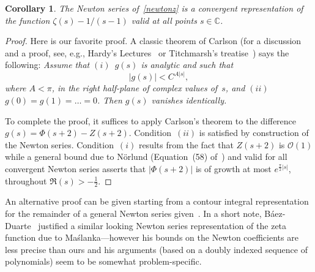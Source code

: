 \documentclass{amsart}
\def\C{\mathbb{C}}
\def\ds{\displaystyle}
\newtheorem{corollary}{Corollary}
\begin{document}
\begin{corollary}\label{newton-cor} The Newton series of~\eqref{newtonz} 
is a convergent representation of the function $\zeta(s)-1/(s-1)$
valid at all points $s\in\C$.
\end{corollary}
\begin{proof} 
Here  is our favorite  proof.  A   classic theorem  of Carlson  (for a
discussion        and      a     proof,     see,      e.g.,    Hardy's
Lectures~\cite[pp.~188-191]{Hardy78}          or          Titchmarsh's
treatise~\cite[\S5.81]{Titchmarsh39})  says the following:
\emph{Assume that $(i)$~$g(s)$ is
analytic and such that
\[
\left|g(s)\right|<C^{A|s|},
\]
where $A<\pi$, in the right half-plane of complex values of~$s$,
and $(ii)$~$g(0)=g(1)=\ldots=0$. Then $g(s)$ vanishes identically.}


To complete the proof, it  suffices to apply  Carlson's theorem to the
difference    $g(s)=\Phi(s+2)-Z(s+2)$.
Condition~$(ii)$ is    satisfied  by   construction  of    the  Newton
series. Condition~$(i)$ results from  the fact that $Z(s+2)$ is $\mathcal{O}(1)$
while  a general bound  due to N\"orlund 
(Equation~(58) of~\cite[p.~228]{Norlund54})
and valid for all convergent Newton series
asserts that $|\Phi(s+2)|$  is of 
growth at most $e^{\frac{\pi}{2}|s|}$, throughout $\Re(s)>-\frac12$.
% 
% 
% 
\end{proof}

An alternative proof can be given starting from a contour integral representation for the remainder of 
a general Newton series given~\cite[p.~223]{Norlund54}. In a short note, B\'aez-Duarte~\cite{Baez03}
justified a similar looking Newton series representation of the zeta function due to Ma\'slanka---however
his bounds on the Newton coefficients are less precise than ours and his arguments (based on
a doubly indexed sequence of polynomials) seem to be somewhat problem-specific.
\end{document}
